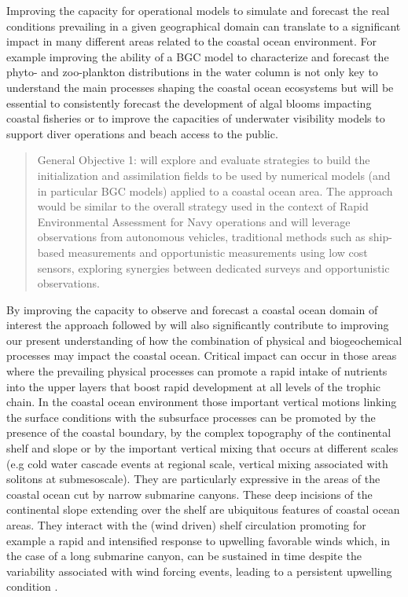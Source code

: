 Improving the capacity for operational models to simulate and forecast
the real conditions prevailing in a given geographical domain can
translate to a significant impact in many different areas related to
the coastal ocean environment. For example improving the ability of a
BGC model to characterize and forecast the phyto- and zoo-plankton
distributions in the water column is not only key to understand the
main processes shaping the coastal ocean ecosystems but will be
essential to consistently forecast the development of algal blooms
impacting coastal fisheries or to improve the capacities of underwater
visibility models to support diver operations and beach access to the
public.
 
\begin{quote}
  \textsf{General Objective 1:} \proj will explore and evaluate
  strategies to build the initialization and assimilation fields to be
  used by numerical models (and in particular BGC models) applied to a
  coastal ocean area. The approach would be similar to the overall
  strategy used in the context of Rapid Environmental Assessment for
  Navy operations and will leverage observations from autonomous
  vehicles, traditional methods such as ship-based measurements and
  opportunistic measurements using low cost sensors, exploring
  synergies between dedicated surveys and opportunistic observations.
\end{quote}
 
By improving the capacity to observe and forecast a coastal ocean
domain of interest the approach followed by \proj will also
significantly contribute to improving our present understanding of how
the combination of physical and biogeochemical processes may impact
the coastal ocean. Critical impact can occur in those areas where the
prevailing physical processes can promote a rapid intake of nutrients
into the upper layers that boost rapid development at all levels of
the trophic chain. In the coastal ocean environment those important
vertical motions linking the surface conditions with the subsurface
processes can be promoted by the presence of the coastal boundary, by
the complex topography of the continental shelf and slope or by the
important vertical mixing that occurs at different scales (e.g cold
water cascade events at regional scale, vertical mixing associated
with solitons at submesoscale). They are particularly expressive in
the areas of the coastal ocean cut by narrow submarine canyons. These
deep incisions of the continental slope extending over the shelf are
ubiquitous features of coastal ocean areas.  They interact with the
(wind driven) shelf circulation promoting for example a rapid and
intensified response to upwelling favorable winds \cite{she00} which,
in the case of a long submarine canyon, can be sustained in time
despite the variability associated with wind forcing events, leading
to a persistent upwelling condition \cite{allen00}.

